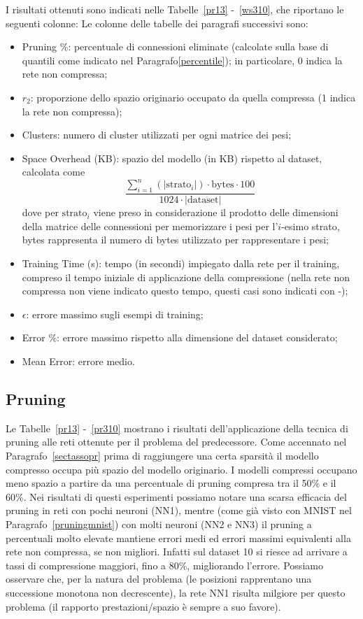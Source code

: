 \documentclass[11pt,a4paper,twoside,
openright]{book}
\begin{document}
I risultati ottenuti sono indicati nelle Tabelle~\ref{pr13} -~\ref{ws310}, che riportano le seguenti colonne:
Le colonne delle tabelle dei paragrafi successivi sono:
\begin{itemize}
\item Pruning \%: percentuale di connessioni eliminate (calcolate sulla base di quantili come indicato nel Paragrafo\ref{percentile}); in particolare, 0 indica la rete non compressa;
\item $r_2$: proporzione dello spazio originario occupato da quella compressa (1 indica la rete non compressa);
\item Clusters: numero di cluster utilizzati per ogni matrice dei pesi;
\item Space Overhead (KB):  spazio del modello (in KB) rispetto al dataset, calcolata come $$\displaystyle{\frac{\sum\limits_{i=1}^n \left(|\mathrm{strato}_i|\right) \cdot \mathrm{bytes} \cdot 100}{1024 \cdot \left| \mathrm{dataset} \right|}}$$ dove per $\mathrm{strato}_i$ viene preso in considerazione il prodotto delle dimensioni della matrice delle connessioni per memorizzare i pesi per l'$i$-esimo strato, bytes rappresenta il numero di bytes utilizzato per rappresentare i pesi;
\item Training Time (s): tempo (in secondi) impiegato dalla rete per il training, compreso il tempo iniziale di applicazione della compressione (nella rete non compressa non viene indicato questo tempo, questi casi sono indicati con -);
\item $\epsilon$: errore massimo sugli esempi di training;
\item Error \%: errore massimo rispetto alla dimensione del dataset considerato;
\item Mean Error: errore medio.
\end{itemize}

\subsection{Pruning}
\label{prpred}
Le Tabelle~\ref{pr13} -~\ref{pr310} mostrano i risultati dell'applicazione della tecnica di pruning alle reti ottenute per il problema del predecessore. Come accennato nel Paragrafo~\ref{sectassopr} prima di raggiungere una certa sparsità il modello compresso occupa più spazio del modello originario. I modelli compressi occupano meno spazio a partire da una percentuale di pruning compresa tra il 50\% e il 60\%.
Nei risultati di questi esperimenti possiamo notare una scarsa efficacia del pruning in reti con pochi neuroni (NN1), mentre (come già visto con MNIST nel Paragrafo~\ref{pruningmnist}) con molti neuroni (NN2 e NN3) il pruning a percentuali molto elevate mantiene errori medi ed errori massimi equivalenti alla rete non compressa, se non migliori. 
Infatti sul dataset 10 si riesce ad arrivare a tassi di compressione maggiori, fino a 80\%, migliorando l'errore. Possiamo osservare che, per la natura del problema (le posizioni rapprentano una successione monotona non decrescente), la rete NN1 risulta milgiore per questo problema (il rapporto prestazioni/spazio è sempre a suo favore).

\end{document}
